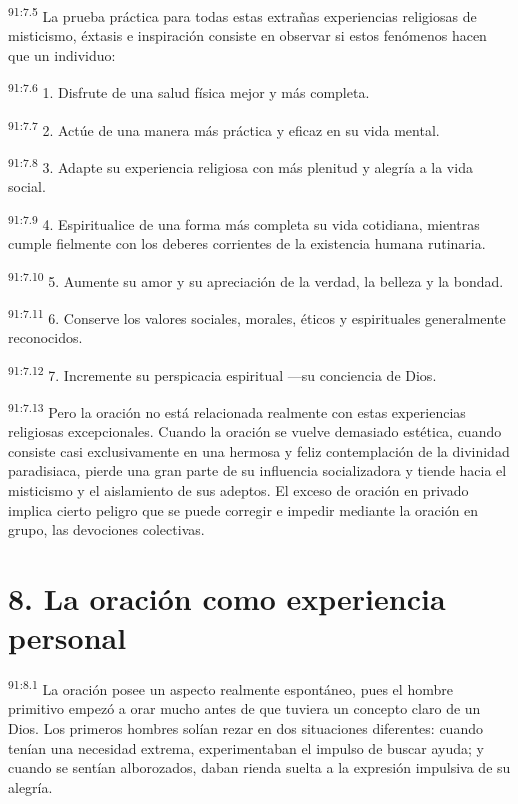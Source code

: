 \documentclass[twoside, 11pt]{book}
\begin{document}
\par
\textsuperscript{91:7.5} La prueba práctica para todas estas extrañas experiencias religiosas de misticismo, éxtasis e inspiración consiste en observar si estos fenómenos hacen que un individuo:

\par
\textsuperscript{91:7.6} 1. Disfrute de una salud física mejor y más completa.

\par
\textsuperscript{91:7.7} 2. Actúe de una manera más práctica y eficaz en su vida mental.

\par
\textsuperscript{91:7.8} 3. Adapte su experiencia religiosa con más plenitud y alegría a la vida social.

\par
\textsuperscript{91:7.9} 4. Espiritualice de una forma más completa su vida cotidiana, mientras cumple fielmente con los deberes corrientes de la existencia humana rutinaria.

\par
\textsuperscript{91:7.10} 5. Aumente su amor y su apreciación de la verdad, la belleza y la bondad.

\par
\textsuperscript{91:7.11} 6. Conserve los valores sociales, morales, éticos y espirituales generalmente reconocidos.

\par
\textsuperscript{91:7.12} 7. Incremente su perspicacia espiritual ---su conciencia de Dios.

\par
\textsuperscript{91:7.13} Pero la oración no está relacionada realmente con estas experiencias religiosas excepcionales. Cuando la oración se vuelve demasiado estética, cuando consiste casi exclusivamente en una hermosa y feliz contemplación de la divinidad paradisiaca, pierde una gran parte de su influencia socializadora y tiende hacia el misticismo y el aislamiento de sus adeptos. El exceso de oración en privado implica cierto peligro que se puede corregir e impedir mediante la oración en grupo, las devociones colectivas.

\section*{8. La oración como experiencia personal}
\par
\textsuperscript{91:8.1} La oración posee un aspecto realmente espontáneo, pues el hombre primitivo empezó a orar mucho antes de que tuviera un concepto claro de un Dios. Los primeros hombres solían rezar en dos situaciones diferentes: cuando tenían una necesidad extrema, experimentaban el impulso de buscar ayuda; y cuando se sentían alborozados, daban rienda suelta a la expresión impulsiva de su alegría.
\end{document}
